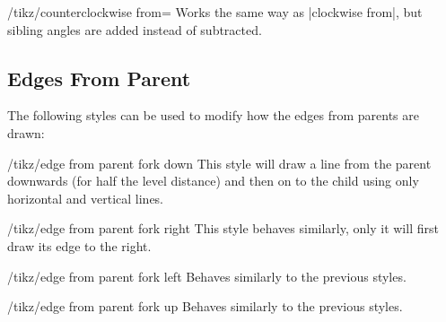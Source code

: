 \begin{key}{/tikz/counterclockwise from=}
    Works the same way as |clockwise from|, but sibling angles are added
    instead of subtracted.
\end{key}


\subsection{Edges From Parent}

The following styles can be used to modify how the edges from parents are
drawn:

\begin{stylekey}{/tikz/edge from parent fork down}
    This style will draw a line from the parent downwards (for half the level
    distance) and then on to the child using only horizontal and vertical
    lines.
\begin{codeexample}[]
\end{codeexample}
\end{stylekey}

\begin{stylekey}{/tikz/edge from parent fork right}
    This style behaves similarly, only it will first draw its edge to the
    right.
\begin{codeexample}[]
\end{codeexample}
\end{stylekey}

\begin{stylekey}{/tikz/edge from parent fork left}
    Behaves similarly to the previous styles.
\end{stylekey}

\begin{stylekey}{/tikz/edge from parent fork up}
    Behaves similarly to the previous styles.
\end{stylekey}


